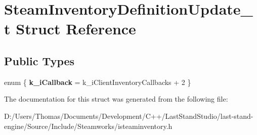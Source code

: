 \hypertarget{structSteamInventoryDefinitionUpdate__t}{}\section{Steam\+Inventory\+Definition\+Update\+\_\+t Struct Reference}
\label{structSteamInventoryDefinitionUpdate__t}
\subsection*{Public Types}
\begin{DoxyCompactItemize}
\item 
\hypertarget{structSteamInventoryDefinitionUpdate__t_a99a69f4ddda08589cca8b8d95d6d68d3}{}enum \{ {\bfseries k\+\_\+i\+Callback} = k\+\_\+i\+Client\+Inventory\+Callbacks + 2
 \}\label{structSteamInventoryDefinitionUpdate__t_a99a69f4ddda08589cca8b8d95d6d68d3}

\end{DoxyCompactItemize}


The documentation for this struct was generated from the following file\+:\begin{DoxyCompactItemize}
\item 
D\+:/\+Users/\+Thomas/\+Documents/\+Development/\+C++/\+Last\+Stand\+Studio/last-\/stand-\/engine/\+Source/\+Include/\+Steamworks/isteaminventory.\+h\end{DoxyCompactItemize}
